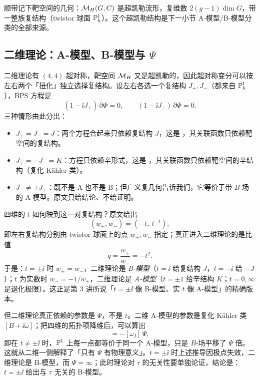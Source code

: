 顺带记下靶空间的几何：$\mathcal{M}_{H}(G,C)$ 是超凯勒流形，复维数 $2(g-1)\dim G$，带一整族复结构（twistor 球面 $\mathbb{P}^1_h$）。这个超凯勒结构是下一小节 A-模型/B-模型分类的全部来源。

\subsection{二维理论：A-模型、B-模型与 $\Psi$}

二维理论有 $(4,4)$ 超对称，靶空间 $\mathcal{M}_{H}$ 又是超凯勒的，因此超对称变分可以按左右两个「扭化」独立选择复结构。设左右各选一个复结构 $J_+,J_-$（都来自 $\mathbb{P}^1_h$），BPS 方程是
\begin{equation}
(1-\ii J_+)\,\bar\partial\Phi=0,\qquad
(1-\ii J_-)\,\partial\Phi=0.
\label{eq:bps2d}
\end{equation}
 三种情形由此分出：

\begin{itemize}
\item $J_+=J_-=J$：两个方程合起来只依赖复结构 $J$，这是 ，其关联函数只依赖靶空间的复结构。
\item $J_+=-J_-=K$：方程只依赖辛形式，这是 ，其关联函数只依赖靶空间的辛结构（复化 Kähler 类）。
\item $J_-\neq\pm J_+$：既不是 A 也不是 B；但广义复几何告诉我们，它等价于带 $B$-场的 A-模型。原文只给结论、不给证明。
\end{itemize}

四维的 $t$ 如何映到这一对复结构？原文给出
\begin{equation}
(w_+,w_-)=(-t,\ t^{-1}),
\label{eq:w-t}
\end{equation}
即左右复结构分别由 twistor 球面上的点 $w_+,w_-$ 指定；真正进入二维理论的是比值
\begin{equation}
q=\frac{w_+}{w_-}=-t^2.
\label{eq:q}
\end{equation}
 于是：$t=\pm\ii$ 时 $w_+=w_-$，二维理论是 \emph{B-模型}（$t=\ii$ 给复结构 $J$，$t=-\ii$ 给 $-J$）；$t$ 为实数时 $w_-=-1/\bar w_+$，二维理论是 \emph{A-模型}（$t=\pm1$ 给辛结构 $K$；$t=0,\infty$ 是退化极限）。这正是第 3 讲所说「$t=\pm\ii$ 像 B-模型、实 $t$ 像 A-模型」的精确版本。

但二维理论真正依赖的参数是 $\Psi$，不是 $t$。二维 A-模型的参数是复化 Kähler 类 $[B+\ii\omega]$；把四维的拓扑项降维后，可以算出
\begin{equation}
[B+\ii\omega]=-[\omega_I]\,\Psi,
\label{eq:B-i-omega}
\end{equation}
即在 $t\neq\pm\ii$ 时，$\mathbb{P}^1$ 上每一点都等价于同一个 A-模型，只是 $B$-场平移了 $\Psi$ 倍。 这就从二维一侧解释了「只有 $\Psi$ 有物理意义」。$t=\pm\ii$ 时上述推导因极点失效，二维理论是 B-模型，而 $\Psi=\infty$；此时理论对 $\tau$ 的无关性要单独论证，结论是：$t=\pm\ii$ 给出与 $\tau$ 无关的 B-模型。

